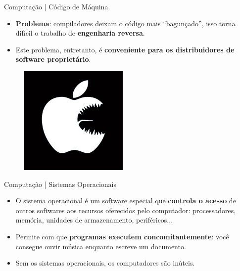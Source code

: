 \documentclass{beamer}
\begin{document}
\begin{frame}{Computação | Código de Máquina}
    \begin{itemize}
        \item \textbf{Problema}: compiladores deixam o código mais ``bagunçado'', isso torna difícil o trabalho de \textbf{engenharia reversa}. 
        \item Este problema, entretanto, é \textbf{conveniente para os distribuidores de software proprietário}.
    \end{itemize}
    \begin{figure}
        \centering
        \includegraphics[width=0.25\linewidth]{img/evil-apple.jpg}
    \end{figure}
\end{frame}

\begin{frame}{Computação | Sistemas Operacionais}
    \begin{itemize}
        \item O sistema operacional é um software especial que \textbf{controla o acesso} de outros softwares aos recursos oferecidos pelo computador: processadores, memória, unidades de armazenamento, periféricos...
        \item Permite com que \textbf{programas executem concomitantemente}: você consegue ouvir música enquanto escreve um documento.
        \item Sem os sistemas operacionais, os computadores são inúteis.
    \end{itemize}
\end{frame}

{
\begin{frame}[plain]
\end{frame}
}
\end{document}
